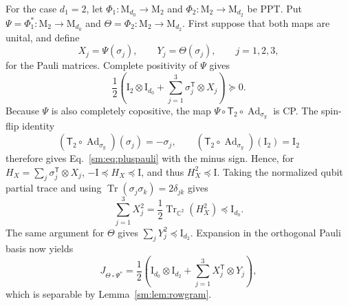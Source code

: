\documentclass[aps,prl,reprint,superscriptaddress,nofootinbib]{revtex4-2}
\newcommand{\M}{\mathrm{M}}
\newcommand{\I}{\mathrm{I}}
\newcommand{\C}{\mathbb C}
\newcommand{\Ad}{\operatorname{Ad}}
\newcommand{\Tr}{\operatorname{Tr}}
\newcommand{\Tmap}{\mathsf T}
\begin{document}
For the case $d_1=2$, let \(\Phi_1:\M_{d_0}\to\M_2\) and
\(\Phi_2:\M_2\to\M_{d_2}\) be PPT.
Put \(\Psi=\Phi_1^*:\M_2\to\M_{d_0}\) and
\(\Theta=\Phi_2:\M_2\to\M_{d_2}\).  First suppose that both maps are
unital, and define
\begin{equation}
 X_j=\Psi(\sigma_j),\qquad Y_j=\Theta(\sigma_j),
 \qquad j=1,2,3,
\label{sm:eq:XYpauli}
\end{equation}
for the Pauli matrices.  Complete positivity of \(\Psi\) gives
\begin{equation}
 \frac12\left(\I_2\otimes\I_{d_0}
 +\sum_{j=1}^3\sigma_j^{\mathsf T}\otimes X_j\right)\succeq0.
\label{sm:eq:pluspauli}
\end{equation}
Because \(\Psi\) is also completely copositive, the map
\(\Psi\circ\Tmap_2\circ\Ad_{\sigma_y}\) is CP.  The spin-flip identity
\begin{equation}
 (\Tmap_2\circ\Ad_{\sigma_y})(\sigma_j)=-\sigma_j,
 \qquad
 (\Tmap_2\circ\Ad_{\sigma_y})(\I_2)=\I_2
\label{sm:eq:spinflip}
\end{equation}
therefore gives Eq.~\eqref{sm:eq:pluspauli} with the minus sign.  Hence,
for \(H_X=\sum_j\sigma_j^{\mathsf T}\otimes X_j\),
\(-\I\preceq H_X\preceq\I\), and thus \(H_X^2\preceq\I\).  Taking the
normalized qubit partial trace and using
\(\Tr(\sigma_j\sigma_k)=2\delta_{jk}\) gives
\begin{equation}
 \sum_{j=1}^3X_j^2
 =\frac12\Tr_{\C^2}(H_X^2)\preceq\I_{d_0}.
\label{sm:eq:Xrow}
\end{equation}
The same argument for \(\Theta\) gives
\(\sum_jY_j^2\preceq\I_{d_2}\).  Expansion in the orthogonal Pauli
basis now yields
\begin{equation}
 J_{\Theta\circ\Psi^*}
 =\frac12\left(\I_{d_0}\otimes\I_{d_2}
 +\sum_{j=1}^3X_j^{\mathsf T}\otimes Y_j\right),
\label{sm:eq:middlechoi}
\end{equation}
which is separable by Lemma~\ref{sm:lem:rowgram}.
\end{document}
